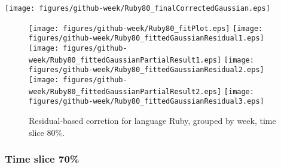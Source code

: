 \begin{center}
{\texttt{[image: figures/github-week/Ruby80\_finalCorrectedGaussian.eps]}}
\end{center}

\FloatBarrier

\begin{figure}[t]
\centering
{}
{\texttt{[image: figures/github-week/Ruby80\_fitPlot.eps]}}
{\texttt{[image: figures/github-week/Ruby80\_fittedGaussianResidual1.eps]}}
{\texttt{[image: figures/github-week/Ruby80\_fittedGaussianPartialResult1.eps]}}
{\texttt{[image: figures/github-week/Ruby80\_fittedGaussianResidual2.eps]}}
{\texttt{[image: figures/github-week/Ruby80\_fittedGaussianPartialResult2.eps]}}
{\texttt{[image: figures/github-week/Ruby80\_fittedGaussianResidual3.eps]}}
\caption{Residual-based corretion for language Ruby, grouped by week, time slice 80\%.}
\end{figure}


\FloatBarrier


\subsubsection{Time slice 70\%}

